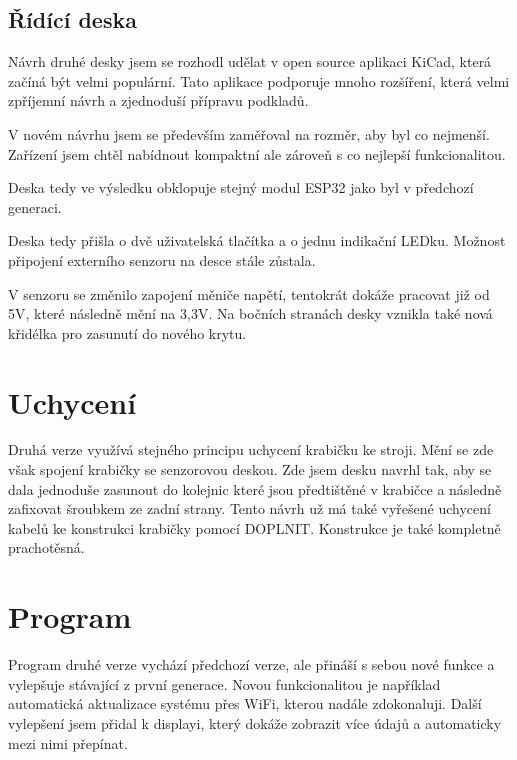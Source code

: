 \subsection{Řídící deska}
Návrh druhé desky jsem se rozhodl udělat v open source aplikaci KiCad, která začíná být velmi populární. 
Tato aplikace podporuje mnoho rozšíření, která velmi zpříjemní návrh a zjednoduší přípravu podkladů.

V novém návrhu jsem se především zaměřoval na rozměr, aby byl co nejmenší.
Zařízení jsem chtěl nabídnout kompaktní ale zároveň s co nejlepší funkcionalitou.

Deska tedy ve výsledku obklopuje stejný modul ESP32 jako byl v předchozí generaci.

Deska tedy přišla o dvě uživatelská tlačítka a o jednu indikační LEDku. 
Možnost připojení externího senzoru na desce stále zůstala.

V senzoru se změnilo zapojení měniče napětí, tentokrát dokáže pracovat již od 5V, které následně mění na 3,3V.
Na bočních stranách desky vznikla také nová křidélka pro zasunutí do nového krytu.

\fxnote[author=JA]{\textcolor{mygreen}{krabička popis, uchycení}}
\fxnote[author=JA]{\textcolor{mygreen}{Obrázek deksa => krabička}}

\section{Uchycení}
Druhá verze využívá stejného principu uchycení krabičku ke stroji. 
Mění se zde však spojení krabičky se senzorovou deskou. 
Zde jsem desku navrhl tak, aby se dala jednoduše zasunout do kolejnic které jsou předtištěné v krabičce a následně zafixovat šroubkem ze zadní strany.
Tento návrh už má také vyřešené uchycení kabelů ke konstrukci krabičky pomocí \textcolor{mygreen}{DOPLNIT}.
Konstrukce je také kompletně prachotěsná.


\section{Program}
Program druhé verze vychází předchozí verze, ale přináší s sebou nové funkce a vylepšuje stávající z první generace.
Novou funkcionalitou je například automatická aktualizace systému přes WiFi, kterou nadále zdokonaluji.
Další vylepšení jsem přidal k displayi, který dokáže zobrazit více údajů a automaticky mezi nimi přepínat.
\newpage